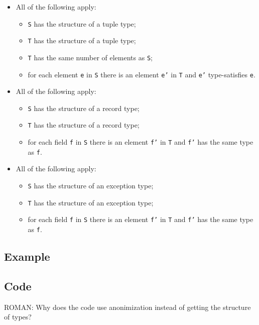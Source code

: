 \documentclass{book}
\begin{document}
\begin{itemize}
  \item All of the following apply:
    \begin{itemize}
    \item \texttt{S} has the structure of a tuple type;
    \item \texttt{T} has the structure of a tuple type;
    \item \texttt{T} has the same number of elements as \texttt{S};
    \item for each element \texttt{e} in \texttt{S} there is an element \texttt{e'} in \texttt{T} and \texttt{e'}
      type-satisfies \texttt{e}.
    \end{itemize}

  \item All of the following apply:
    \begin{itemize}
    \item \texttt{S} has the structure of a record type;
    \item \texttt{T} has the structure of a record type;
    \item for each field \texttt{f} in \texttt{S} there is an element \texttt{f'} in \texttt{T} and \texttt{f'} has
      the same type as \texttt{f}.
    \end{itemize}

  \item All of the following apply:
    \begin{itemize}
    \item \texttt{S} has the structure of an exception type;
    \item \texttt{T} has the structure of an exception type;
    \item for each field \texttt{f} in \texttt{S} there is an element \texttt{f'} in \texttt{T} and \texttt{f'} has
      the same type as \texttt{f}.
    \end{itemize}
  \end{itemize}

  \subsection{Example}

  \subsection{Code}
\begin{emptytodo}
ROMAN: Why does the code use anonimization instead of getting the structure of types?
\end{emptytodo}
\end{document}
